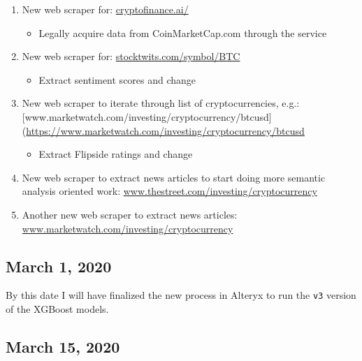 \documentclass[
]{book}
\providecommand{\tightlist}{%
  \setlength{\itemsep}{0pt}\setlength{\parskip}{0pt}}
\begin{document}
\begin{enumerate}
\def\labelenumi{\arabic{enumi}.}
\item
  New web scraper for: \href{https://cryptofinance.ai/}{cryptofinance.ai/}

  \begin{itemize}
  \tightlist
  \item
    Legally acquire data from CoinMarketCap.com through the service
  \end{itemize}
\item
  New web scraper for: \href{https://stocktwits.com/symbol/BTC}{stocktwits.com/symbol/BTC}

  \begin{itemize}
  \tightlist
  \item
    Extract sentiment scores and change
  \end{itemize}
\item
  New web scraper to iterate through list of cryptocurrencies, e.g.: {[}www.marketwatch.com/investing/cryptocurrency/btcusd{]}(\url{https://www.marketwatch.com/investing/cryptocurrency/btcusd}

  \begin{itemize}
  \tightlist
  \item
    Extract Flipside ratings and change
  \end{itemize}
\item
  New web scraper to extract news articles to start doing more semantic analysis oriented work: \href{https://www.thestreet.com/investing/cryptocurrency}{www.thestreet.com/investing/cryptocurrency}
\item
  Another new web scraper to extract news articles: \href{https://www.marketwatch.com/investing/cryptocurrency}{www.marketwatch.com/investing/cryptocurrency}
\end{enumerate}

\hypertarget{march-1-2020}{%
\subsection{March 1, 2020}\label{march-1-2020}}

By this date I will have finalized the new process in Alteryx to run the \texttt{v3} version of the XGBoost models.

\hypertarget{march-15-2020}{%
\subsection{March 15, 2020}\label{march-15-2020}}
\end{document}
